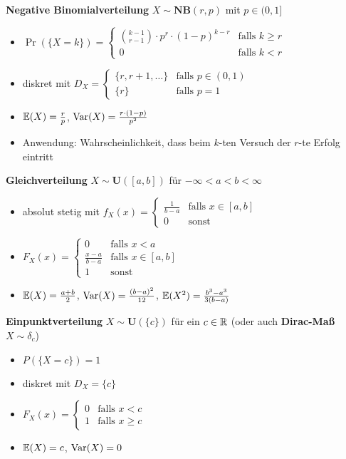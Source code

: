 \textbf{Negative Binomialverteilung} $X\sim\mathbf{NB}(r,p)$ mit $p \in (0,1]$
\begin{itemize}
	\item $\Pr(\{X=k\}) = \begin{cases}
		\binom{k-1}{r-1} \cdot p^r\cdot (1-p)^{k-r} & \text{falls } k\geq r \\
		0 &  \text{falls } k < r
	\end{cases}$
	
	\item diskret mit $D_X = \begin{cases}
		\{r,r+1,\ldots\}              & \text{falls } p \in (0,1)  \\
		\{r\}           & \text{falls } p = 1
	\end{cases}$
	
	\item $\mathbb{E}(X) = \frac{r}{p}$, $\operatorname{Var}(X) = \frac{r\cdot (1-p)}{p^2}$
	
	\item Anwendung: Wahrscheinlichkeit, dass beim $k$-ten Versuch der $r$-te Erfolg eintritt
\end{itemize}

\textbf{Gleichverteilung} $X\sim\mathbf{U}([a,b])$ für $-\infty < a < b < \infty$
\begin{itemize}
\item absolut stetig mit
  $f_X(x) = \begin{cases}
  \frac{1}{b-a} 	& \text{falls } x \in [a,b]	\\
  0				& \text{sonst }
  \end{cases}$

\item
  $F_X(x) = \begin{cases}
  0               & \text{falls } x < a	    	\\
  \frac{x-a}{b-a} & \text{falls } x \in [a,b]	\\
  1               & \text{sonst}
  \end{cases}$

\item $\mathbb{E}(X) = \frac{a+b}{2}$, $\operatorname{Var}(X) = \frac{(b-a)^2}{12}$,
  $\mathbb{E}(X^2) = \frac{b^3-a^3}{3(b-a)}$
\end{itemize}

\textbf{Einpunktverteilung} $X\sim\mathbf{U}(\{c\})$ für ein $c\in\mathbb{R}$ (oder auch \textbf{Dirac-Maß} $X\sim\delta_c$)
\begin{itemize}
\item $P(\{X=c\}) = 1$

\item diskret mit $D_X = \{c\}$

\item
  $F_X(x) = \begin{cases}
  0 	&\text{falls } x < c     \\
  1 & \text{falls } x \geq c
  \end{cases}$

\item $\mathbb{E}(X) = c$, $\operatorname{Var}(X) = 0$
\end{itemize}

